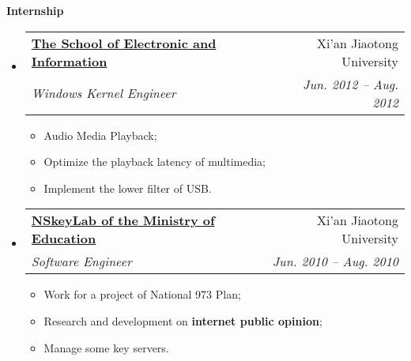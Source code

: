 \documentclass[letterpaper,11pt]{article}
\makeatletter
\newcommand{\resitem}[1]{\item #1 \vspace{-2pt}}
\newcommand{\resheading}[1]{{\large \colorbox{mygrey}{\begin{minipage}{\textwidth}{\textbf{#1 \vphantom{p\^{E}}}}\end{minipage}}}}
\newcommand{\ressubheading}[4]{
\begin{tabular*}{6.5in}{l@{\extracolsep{\fill}}r}
		\textbf{#1} & #2 \\
		\textit{#3} & \textit{#4} \\
\end{tabular*}\vspace{-6pt}}
\makeatother
\begin{document}
\resheading{Internship}
	\begin{itemize}
		\item 
			\ressubheading{\href{http://eie.xjtu.edu.cn/}{The School of Electronic and Information}}{Xi'an Jiaotong University}{Windows Kernel Engineer}{Jun. 2012 -- Aug. 2012}
				{ \footnotesize
				\begin{itemize}
					\resitem{Audio Media Playback;}
					\resitem{Optimize the playback latency of multimedia;}
					\resitem{Implement the lower filter of USB.}
				\end{itemize}
				}
		\item 
			\ressubheading{\href{http://nskeylab.xjtu.edu.cn/}{NSkeyLab of the Ministry of Education}}{Xi'an Jiaotong University}{Software Engineer}{Jun. 2010 -- Aug. 2010}
				{ \footnotesize
				\begin{itemize}
					\resitem{Work for a project of National 973 Plan;}
					\resitem{Research and development on \textbf{internet public opinion};}
					\resitem{Manage some key servers.}
				\end{itemize}
				}

	\end{itemize}
\end{document}
